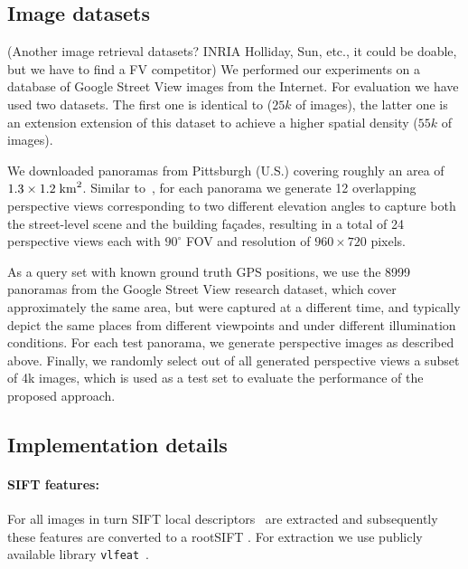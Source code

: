 \documentclass[table]{article} %
\begin{document}
   	\subsection{Image datasets}
   		\textcolor{myRed}{(Another image retrieval datasets? INRIA Holliday, Sun, etc., it could be doable, but we have to find a FV competitor)}\newline
		We performed our experiments on a database of Google Street View images from the Internet. For evaluation we have used two datasets. The first one is identical to \cite{Gronat2013, Torii2011} ($25k$ of images), the latter one is an extension extension of this dataset to achieve a higher spatial density ($55k$ of images).

		We downloaded panoramas from Pittsburgh (U.S.) covering roughly an area of $1.3 \times 1.2 \; {\rm km}^2$. Similar to~\cite{Chen11}, for each panorama we generate 12 overlapping perspective views corresponding to two different elevation angles to capture both the street-level scene and the building fa\c{c}ades, resulting in a total of 24 perspective views each with $90^\circ$ FOV and resolution of $960 \times 720$ pixels.

		As a query set with known ground truth GPS positions, we use the 8999 panoramas from the Google Street View research dataset, which cover approximately the same area, but were captured at a different time, and typically depict the same places from different viewpoints and under different illumination conditions. For each test panorama, we generate perspective images as described above. Finally, we randomly select out of all generated perspective views a subset of 4k images, which is used as a test set to evaluate the performance of the proposed approach.

   \subsection{Implementation details}
	   	\paragraph{SIFT features:}
	   		For all images in turn SIFT local descriptors~\cite{Lowe04} are extracted and subsequently these features are converted to a rootSIFT \cite{Arandjelovic12}. For extraction we use publicly available library {\tt vlfeat}~\cite{vlfeat}.
	    
\end{document}

